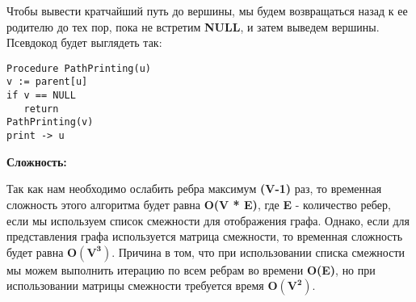 Чтобы вывести кратчайший путь до вершины, мы будем возвращаться назад к ее родителю до тех пор, пока не встретим \textbf{NULL}, и затем выведем вершины. Псевдокод будет выглядеть так:

\begin{tcolorbox}
\begin{verbatim}
Procedure PathPrinting(u)
v := parent[u]
if v == NULL
   return
PathPrinting(v)
print -> u
\end{verbatim}
\end{tcolorbox}

\textbf{Сложность:}

\vspace{\baselineskip}

Так как нам необходимо ослабить ребра максимум \textbf{(V-1)} раз, то временная сложность этого алгоритма будет равна \textbf{O(V * E)}, где \textbf{E} - количество ребер, если мы используем { список смежности} для отображения графа. Однако, если для представления графа используется { матрица смежности}, то временная сложность будет равна $\mathbf{O(V^3)}$. Причина в том, что при использовании { списка смежности} мы можем выполнить итерацию по всем ребрам во времени \textbf{O(E)}, но при использовании { матрицы смежности} требуется время $\mathbf{O(V^2)}$.